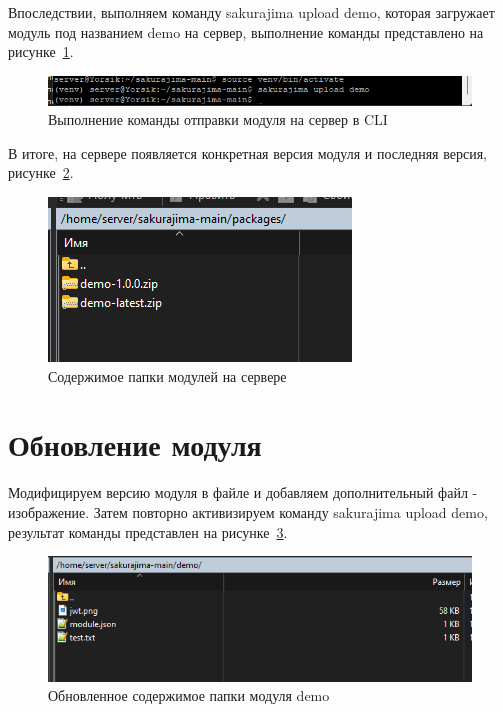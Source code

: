 Впоследствии, выполняем команду sakurajima upload demo, которая загружает модуль под названием demo на сервер, выполнение команды представлено на рисунке~\ref{fig:test2}. 

\begin{figure}
  \centering
  \includegraphics[width=1.0\textwidth]{graphics/test/demo.png}
  \caption{Выполнение команды отправки модуля на сервер в CLI}
  \label{fig:test2}
\end{figure}

В итоге, на сервере появляется конкретная версия модуля и последняя версия, рисунке~\ref{fig:test3}. 

\begin{figure}
  \centering
  \includegraphics[width=.7\textwidth]{graphics/test/demo_alias_modules.png}
  \caption{Содержимое папки модулей на сервере}
  \label{fig:test3}
\end{figure}

\section{Обновление модуля}

Модифицируем версию модуля в файле и добавляем дополнительный файл - изображение. Затем повторно активизируем команду sakurajima upload demo, результат команды представлен на рисунке~\ref{fig:test4}. 

\begin{figure}
  \centering
  \includegraphics[width=.8\textwidth]{graphics/test/demo_jwt.png}
  \caption{Обновленное содержимое папки модуля demo}
  \label{fig:test4}
\end{figure}

